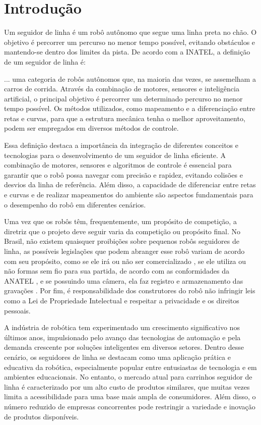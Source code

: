 \chapter{Introdução}

Um seguidor de linha é um robô autônomo que segue uma linha preta no chão. O
objetivo é percorrer um percurso no menor tempo possível, evitando obstáculos e
mantendo-se dentro dos limites da pista. De acordo com a INATEL, a definição de
um seguidor de linha é:

\begin{citacao}
  \lbrack...\rbrack 
  \space
  uma categoria de robôs autônomos que, na maioria das vezes, se assemelham a
  carros de corrida. Através da combinação de motores, sensores e inteligência
  artificial, o principal objetivo é percorrer um determinado percurso no menor
  tempo possível. Os métodos utilizados, como mapeamento e a diferenciação entre
  retas e curvas, para que a estrutura mecânica tenha o melhor aproveitamento,
  podem ser empregados em diversos métodos de controle.
  \cite{INATEL:Seguidor-de-Linha}
\end{citacao}

Essa definição destaca a importância da integração de diferentes conceitos e
tecnologias para o desenvolvimento de um seguidor de linha eficiente. A
combinação de motores, sensores e algoritmos de controle é essencial para
garantir que o robô possa navegar com precisão e rapidez, evitando colisões e
desvios da linha de referência. Além disso, a capacidade de diferenciar entre
retas e curvas e de realizar mapeamentos do ambiente são aspectos fundamentais
para o desempenho do robô em diferentes cenários.

Uma vez que os robôs têm, frequentemente, um propósito de competição, a diretriz
que o projeto deve seguir varia da competição ou propósito final. No Brasil, não
existem quaisquer proibições sobre pequenos robôs seguidores de linha, as
possíveis legislações que podem abranger esse robô variam de acordo com seu
propósito, como se ele irá ou não ser comercializado \cite{Lei:8078:1990}, se
ele utiliza ou não formas sem fio para sua partida, de acordo com as
conformidades da ANATEL \cite{ANATEL:Manual-de-Orientacoes}, e se possuindo uma
câmera, ela faz registro e armazenamento das gravações \cite{Lei:12651:2012}.
Por fim, é responsabilidade dos construtores do robô não infringir leis como a
Lei de Propriedade Intelectual \cite{Lei:9279:1996} e respeitar a privacidade e
os direitos pessoais.

A indústria de robótica tem experimentado um crescimento significativo nos
últimos anos, impulsionado pelo avanço das tecnologias de automação e pela
demanda crescente por soluções inteligentes em diversos setores. Dentro desse
cenário, os seguidores de linha se destacam como uma aplicação prática e
educativa da robótica, especialmente popular entre entusiastas de tecnologia e
em ambientes educacionais. No entanto, o mercado atual para carrinhos
seguidor de linha é caracterizado por um alto custo de produtos similares, que
muitas vezes limita a acessibilidade para uma base mais ampla de consumidores.
Além disso, o número reduzido de empresas concorrentes pode restringir a
variedade e inovação de produtos disponíveis.

